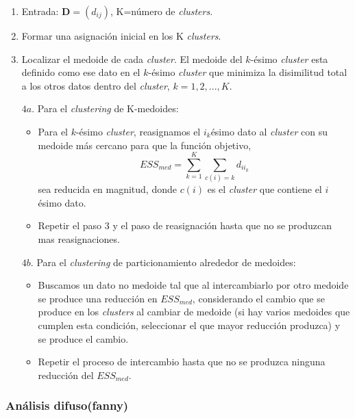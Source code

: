 \documentclass[a4paper, 20pt]{article}
\begin{document}
\begin{enumerate}
\item Entrada: $\textbf{D}=(d_{ij})$, K=número de \textit{clusters}.
\item Formar una asignación inicial en los K \textit{clusters}.
\item Localizar el medoide de cada \textit{cluster}. El medoide del $k$-ésimo \textit{cluster} esta definido como ese dato en el $k$-ésimo \textit{cluster} que minimiza la disimilitud total a los otros datos dentro del \textit{cluster}, $k=1,2,...,K$.


\item[$4a.$] Para el \textit{clustering} de K-medoides:
\begin{itemize}
\item Para el $k$-ésimo \textit{cluster}, reasignamos el $i_k$ésimo dato al \textit{cluster} con su medoide más cercano para que la función objetivo, $$ESS_{med}=\sum_{k=1}^{K}\sum_{c(i)=k}d_{ii_k}$$
sea reducida en magnitud, donde $c(i)$ es el \textit{cluster} que contiene el $i$ésimo dato.
\item Repetir el paso 3 y el paso de reasignación hasta que no se produzcan mas reasignaciones.
\end{itemize}
\item[$4b.$] Para  el \textit{clustering} de particionamiento alrededor de medoides:

\begin{itemize}
\item Buscamos un dato no medoide tal que al intercambiarlo por otro medoide se produce una reducción en $ESS_{med}$, considerando el cambio que se produce en los \textit{clusters} al cambiar de medoide (si hay varios medoides que cumplen esta condición, seleccionar el que mayor reducción produzca) y se produce el cambio.

\item Repetir el proceso de intercambio hasta que no se produzca ninguna reducción del $ESS_{med}$.
\end{itemize}
\end{enumerate}

\subsubsection{Análisis difuso(fanny)}
\end{document}
